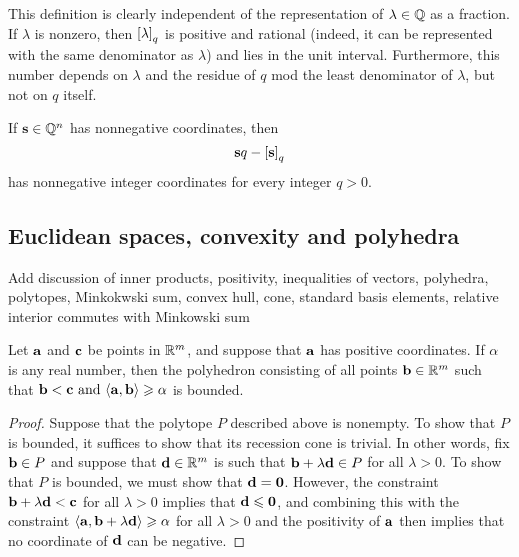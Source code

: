 \documentclass[11pt]{amsart}
\renewcommand{\!}[1]{{\color{red}\text{$\star$\,}#1\,$\star$}}
\begin{document}
This definition is clearly independent of the representation of $\lambda \in \mathbb{Q}$ as a fraction.  If $\lambda$ is nonzero, then $\left[ \lambda \right]_q$ is positive and rational (indeed, it can be represented with the same denominator as $\lambda$) and lies in the unit interval.  Furthermore, this number depends on $\lambda$ and the residue of $q$ mod the least denominator of $\lambda$, but not on $q$ itself.

\begin{remark}  If $\mathbf{s} \in \mathbb{Q}^n$ has nonnegative coordinates, then \[ \mathbf{s}q - \left[ \mathbf{s} \right]_q \] has nonnegative integer coordinates for every integer $q>0$.
\end{remark}


\subsection{Euclidean spaces, convexity and polyhedra} 


 \alert[inline]{Add discussion of inner products, positivity, inequalities of vectors, polyhedra, polytopes, Minkokwski sum, convex hull, cone, standard basis elements, relative interior commutes with Minkowski sum}





\begin{lemma}  
\label{bounded polytope: L}
Let $\mathbf{a}$ and $\mathbf{c}$ be points in $\mathbb{R}^m$, and suppose that $\mathbf{a}$ has positive coordinates.    If $\alpha$ is any real number, then the polyhedron consisting of all points $\mathbf{b} \in \mathbb{R}^m$ such that  $\mathbf{b} < \mathbf{c} \text{ and } \langle \mathbf{a}, \mathbf{b} \rangle \geqslant \alpha$ is bounded.
\end{lemma}

\begin{proof}  Suppose that the polytope $P$ described above is nonempty.   To show that $P$ is bounded, it suffices to show that its recession cone is trivial.  In other words, fix $\mathbf{b} \in P$ and suppose that $\mathbf{d} \in \mathbb{R}^m$ is such that $\mathbf{b} + \lambda \mathbf{d} \in P$ for all $\lambda > 0$.  To show that $P$ is bounded, we must show that $\mathbf{d} = \mathbf{0}$.   However,  the constraint $\mathbf{b} + \lambda \mathbf{d} < \mathbf{c}$ for all $\lambda>0$ implies that $\mathbf{d} \leqslant \mathbf{0}$, and combining this with the constraint $\langle \mathbf{a}, \mathbf{b} + \lambda \mathbf{d} \rangle \geqslant \alpha$ for all $\lambda > 0$ and the positivity of $\mathbf{a}$ then implies that no coordinate of $\mathbf{d}$ can be negative.
\end{proof}
\end{document}
